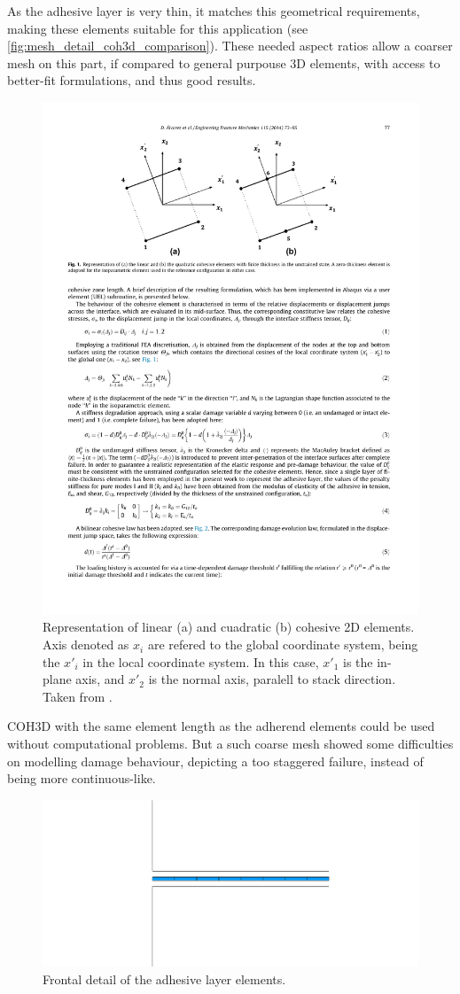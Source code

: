 \documentclass[cmfonts]{witpress}
\begin{document}
As the adhesive layer is very thin, it matches this geometrical requirements, making these elements suitable for this application (see \cref{fig:mesh_detail_coh3d_comparison}). These needed aspect ratios allow a coarser mesh on this part, if compared to general purpouse 3D elements, with access to better-fit formulations, and thus good results.

\begin{figure}
	\centering
	\includegraphics[width=0.7\linewidth]{figures/IMG_CUTRES/coh3d_csys}
	\caption[Representation of linear and cuadratic cohesive 2D elements.]{Representation of linear (a) and cuadratic (b) cohesive 2D elements. Axis denoted as $x_{i}$ are refered to the global coordinate system, being the $x'_{i}$ in the local coordinate system. In this case, $x'_{1}$ is the in-plane axis, and $x'_{2}$ is the normal axis, paralell to stack direction. Taken from \cite{Alvarez2014}.}
	\label{fig:coh3d_csys}
\end{figure}

COH3D with the same element length as the adherend elements could be used without computational problems. But a such coarse mesh showed some difficulties on modelling damage behaviour, depicting a too staggered failure, instead of being more continuous-like.

\begin{figure}
\centering
\includegraphics[width=0.7\linewidth]{figures/IMG_CUTRES/ads_detail}
\caption{Frontal detail of the adhesive layer elements.}
\label{fig:ads_detail}
\end{figure}
\end{document}
